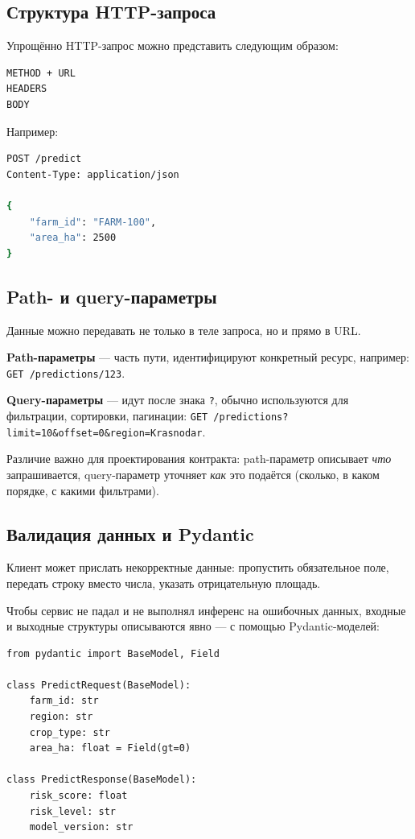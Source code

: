 \documentclass[12pt,a4paper]{article}
\begin{document}
\subsection{Структура HTTP-запроса}

Упрощённо HTTP-запрос можно представить следующим образом:

\begin{lstlisting}[language=bash, caption={Структура HTTP-запроса}]
METHOD + URL
HEADERS
BODY
\end{lstlisting}

Например:

\begin{lstlisting}[language=bash, caption={Пример POST-запроса}]
POST /predict
Content-Type: application/json

{
    "farm_id": "FARM-100",
    "area_ha": 2500
}
\end{lstlisting}

\subsection{Path- и query-параметры}

Данные можно передавать не только в теле запроса, но и прямо в URL.

\textbf{Path-параметры} — часть пути, идентифицируют конкретный ресурс, например: \texttt{GET /predictions/123}.

\textbf{Query-параметры} — идут после знака \texttt{?}, обычно используются для фильтрации, сортировки, пагинации: \texttt{GET /predictions?limit=10\&offset=0\&region=Krasnodar}.

Различие важно для проектирования контракта: path-параметр описывает \emph{что} запрашивается, query-параметр уточняет \emph{как} это подаётся (сколько, в каком порядке, с какими фильтрами).

\subsection{Валидация данных и Pydantic}

Клиент может прислать некорректные данные: пропустить обязательное поле, передать строку вместо числа, указать отрицательную площадь.

Чтобы сервис не падал и не выполнял инференс на ошибочных данных, входные и выходные структуры описываются явно — с помощью Pydantic-моделей:

\begin{lstlisting}[caption={Pydantic-модели запроса и ответа}]
from pydantic import BaseModel, Field

class PredictRequest(BaseModel):
    farm_id: str
    region: str
    crop_type: str
    area_ha: float = Field(gt=0)

class PredictResponse(BaseModel):
    risk_score: float
    risk_level: str
    model_version: str
\end{lstlisting}
\end{document}
